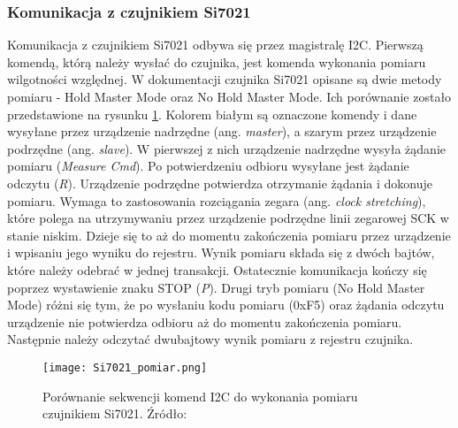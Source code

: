\documentclass[a4paper,12pt,twoside]{article}
\begin{document}
\subsubsection{Komunikacja z czujnikiem Si7021}
Komunikacja z czujnikiem Si7021 odbywa się przez magistralę I2C. Pierwszą komendą, którą należy wysłać do czujnika, jest komenda wykonania pomiaru wilgotności względnej. W dokumentacji czujnika Si7021 opisane są dwie metody pomiaru - Hold Master Mode oraz No Hold Master Mode. Ich porównanie zostało przedstawione na rysunku \ref{fig: metody_pomiaru}. Kolorem białym są oznaczone komendy i dane wysyłane przez urządzenie nadrzędne (ang. \textit{master}), a szarym przez urządzenie podrzędne (ang. \textit{slave}). W pierwszej z nich urządzenie nadrzędne wysyła żądanie pomiaru (\textit{Measure Cmd}). Po potwierdzeniu odbioru wysyłane jest żądanie odczytu (\textit{R}). Urządzenie podrzędne potwierdza otrzymanie żądania i dokonuje pomiaru. Wymaga to zastosowania rozciągania zegara (ang. \textit{clock stretching}), które polega na utrzymywaniu przez urządzenie podrzędne linii zegarowej SCK w stanie niskim. Dzieje się to aż do momentu zakończenia pomiaru przez urządzenie i wpisaniu jego wyniku do rejestru. Wynik pomiaru składa się z dwóch bajtów, które należy odebrać w jednej transakcji. Ostatecznie komunikacja kończy się poprzez wystawienie znaku STOP (\textit{P}). Drugi tryb pomiaru (No Hold Master Mode) różni się tym, że po wysłaniu kodu pomiaru (0xF5) oraz żądania odczytu urządzenie nie potwierdza odbioru aż do momentu zakończenia pomiaru. Następnie należy odczytać dwubajtowy wynik pomiaru z rejestru czujnika.

\begin{figure}[H]
\begin{center}
\texttt{[image: Si7021\_pomiar.png]}
\caption{Porównanie sekwencji komend I2C do wykonania pomiaru czujnikiem Si7021. Źródło: \cite{czujnik_temp}}
\label{fig: metody_pomiaru}
\end{center}
\end{figure}
\end{document}
